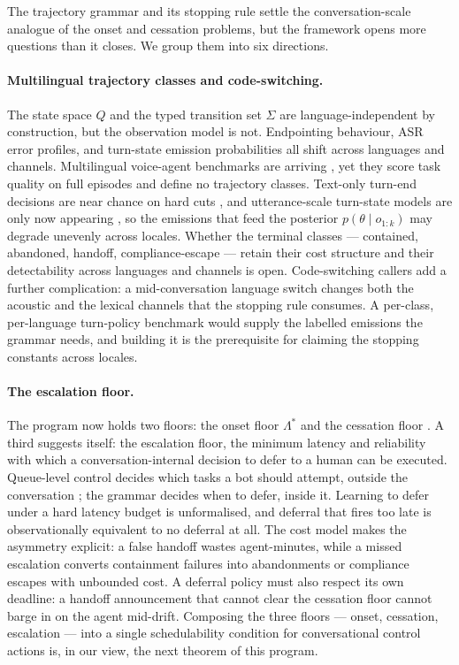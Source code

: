 The trajectory grammar and its stopping rule settle the conversation-scale analogue of the onset and cessation problems, but the framework opens more questions than it closes.
We group them into six directions.

\paragraph{Multilingual trajectory classes and code-switching.}
The state space $Q$ and the typed transition set $\Sigma$ are language-independent by construction, but the observation model is not.
Endpointing behaviour, ASR error profiles, and turn-state emission probabilities all shift across languages and channels.
Multilingual voice-agent benchmarks are arriving \citep{tauvoice2026}, yet they score task quality on full episodes and define no trajectory classes.
Text-only turn-end decisions are near chance on hard cuts \citep{garcia2026asking}, and utterance-scale turn-state models are only now appearing \citep{x2turn2026}, so the emissions that feed the posterior $p(\theta \mid o_{1:k})$ may degrade unevenly across locales.
Whether the terminal classes --- contained, abandoned, handoff, compliance-escape --- retain their cost structure and their detectability across languages and channels is open.
Code-switching callers add a further complication: a mid-conversation language switch changes both the acoustic and the lexical channels that the stopping rule consumes.
A per-class, per-language turn-policy benchmark would supply the labelled emissions the grammar needs, and building it is the prerequisite for claiming the stopping constants across locales.

\paragraph{The escalation floor.}
The program now holds two floors: the onset floor $\Lambda^*$ \citep{garcia2026latencyfloor} and the cessation floor \citep{garcia2026cessationfloor}.
A third suggests itself: the escalation floor, the minimum latency and reliability with which a conversation-internal decision to defer to a human can be executed.
Queue-level control decides which tasks a bot should attempt, outside the conversation \citep{queuecontrol2026}; the grammar decides when to defer, inside it.
Learning to defer under a hard latency budget is unformalised, and deferral that fires too late is observationally equivalent to no deferral at all.
The cost model makes the asymmetry explicit: a false handoff wastes agent-minutes, while a missed escalation converts containment failures into abandonments or compliance escapes with unbounded cost.
A deferral policy must also respect its own deadline: a handoff announcement that cannot clear the cessation floor cannot barge in on the agent mid-drift.
Composing the three floors --- onset, cessation, escalation --- into a single schedulability condition for conversational control actions is, in our view, the next theorem of this program.

